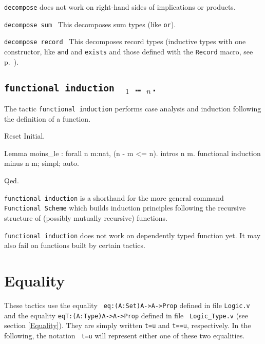 {\tt decompose} does not work on right-hand sides of implications or products.

\begin{Variants}
  
\item {\tt decompose sum \term}
  This decomposes sum types (like \texttt{or}).
\item {\tt decompose record \term}
  This decomposes record types (inductive types with one constructor,
  like \texttt{and} and \texttt{exists} and those defined with the
  \texttt{Record} macro, see p.~\pageref{Record}).
\end{Variants}


\subsection{\tt functional induction \ident\ \term$_1$ \dots\ \term$_n$.}
\label{FunInduction}

The tactic \texttt{functional induction} performs case analysis
and induction following the definition of a function.

\begin{coq_eval}
Reset Initial.
\end{coq_eval}
\begin{coq_example}
Lemma moins_le : forall n m:nat, (n - m <= n).
intros n m.
functional induction minus n m; simpl; auto.
\end{coq_example}
\begin{coq_example*}
Qed.
\end{coq_example*}

\texttt{functional induction} is a shorthand for the more general
command \texttt{Functional Scheme} which builds induction
principles following the recursive structure of (possibly
mutually recursive) functions.

\texttt{functional induction} does not work on dependently typed
function yet. It may also fail on functions built by certain
tactics.

\SeeAlso{\ref{FunScheme},\ref{FunScheme-examples}}

\section{Equality}
These tactics use the equality {\tt
eq:(A:Set)A->A->Prop} defined in file {\tt Logic.v} and the equality
{\tt eqT:(A:Type)A->A->Prop} defined in file {\tt
Logic\_Type.v} (see section \ref{Equality}). They
are simply written {\tt t=u} and {\tt t==u},
respectively.  In the following, the notation {\tt
t=u} will represent either one of these two
equalities.

